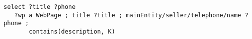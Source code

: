 
{\footnotesize
\begin{verbatim}
select ?title ?phone
   ?wp a WebPage ; title ?title ; mainEntity/seller/telephone/name ?phone ;
       contains(description, K)
\end{verbatim}
}